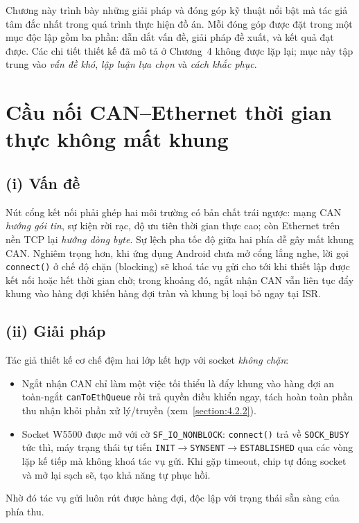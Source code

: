 \documentclass[../DoAn.tex]{subfiles}
\begin{document}
Chương này trình bày những giải pháp và đóng góp kỹ thuật nổi bật mà tác giả tâm
đắc nhất trong quá trình thực hiện đồ án. Mỗi đóng góp được đặt trong một mục độc
lập gồm ba phần: dẫn dắt vấn đề, giải pháp đề xuất, và kết quả đạt được. Các chi
tiết thiết kế đã mô tả ở Chương~4 không được lặp lại; mục này tập trung vào
\emph{vấn đề khó}, \emph{lập luận lựa chọn} và \emph{cách khắc phục}.

\section{Cầu nối CAN--Ethernet thời gian thực không mất khung}
\label{section:5.1}

\subsection*{(i) Vấn đề}
Nút cổng kết nối phải ghép hai môi trường có bản chất trái ngược: mạng CAN
\emph{hướng gói tin}, sự kiện rời rạc, độ ưu tiên thời gian thực cao; còn Ethernet
trên nền TCP lại \emph{hướng dòng byte}. Sự lệch pha tốc độ giữa hai phía dễ gây
mất khung CAN. Nghiêm trọng hơn, khi ứng dụng Android chưa mở cổng lắng nghe, lời
gọi \texttt{connect()} ở chế độ chặn (blocking) sẽ khoá tác vụ gửi cho tới khi
thiết lập được kết nối hoặc hết thời gian chờ; trong khoảng đó, ngắt nhận CAN vẫn
liên tục đẩy khung vào hàng đợi khiến hàng đợi tràn và khung bị loại bỏ ngay tại
ISR.

\subsection*{(ii) Giải pháp}
Tác giả thiết kế cơ chế đệm hai lớp kết hợp với socket \emph{không chặn}:
\begin{itemize}
  \item Ngắt nhận CAN chỉ làm một việc tối thiểu là đẩy khung vào hàng đợi an
    toàn-ngắt \texttt{canToEthQueue} rồi trả quyền điều khiển ngay, tách hoàn toàn
    phần thu nhận khỏi phần xử lý/truyền (xem~\ref{section:4.2.2}).
  \item Socket W5500 được mở với cờ \texttt{SF\_IO\_NONBLOCK}: \texttt{connect()}
    trả về \texttt{SOCK\_BUSY} tức thì, máy trạng thái tự tiến
    \texttt{INIT}$\to$\texttt{SYNSENT}$\to$\texttt{ESTABLISHED} qua các vòng lặp
    kế tiếp mà không khoá tác vụ gửi. Khi gặp timeout, chip tự đóng socket và mở
    lại sạch sẽ, tạo khả năng tự phục hồi.
\end{itemize}
Nhờ đó tác vụ gửi luôn rút được hàng đợi, độc lập với trạng thái sẵn sàng của
phía thu.
\end{document}
